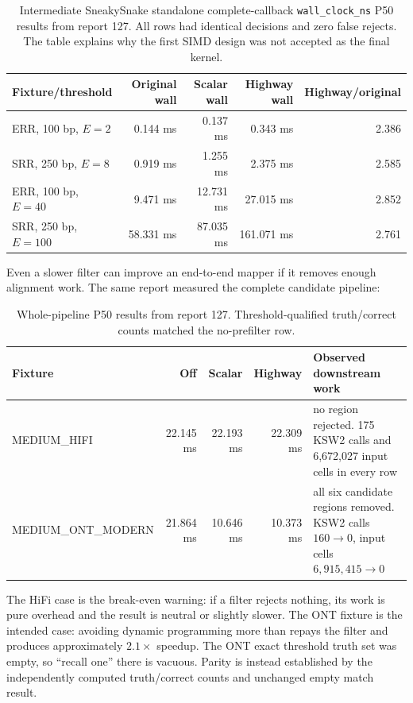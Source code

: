 \begin{table}[htbp]
\centering
\small
\begin{tabular}{lrrrr}
\textbf{Fixture/threshold} & \textbf{Original wall} & \textbf{Scalar wall} &
\textbf{Highway wall} & \textbf{Highway/original}\\
\hline
ERR, 100 bp, \(E=2\)   & 0.144 ms & 0.137 ms & 0.343 ms & 2.386\\
SRR, 250 bp, \(E=8\)   & 0.919 ms & 1.255 ms & 2.375 ms & 2.585\\
ERR, 100 bp, \(E=40\)  & 9.471 ms & 12.731 ms & 27.015 ms & 2.852\\
SRR, 250 bp, \(E=100\) & 58.331 ms & 87.035 ms & 161.071 ms & 2.761\\
\end{tabular}
\caption{Intermediate SneakySnake standalone complete-callback
\texttt{wall\_clock\_ns} P50 results from report 127.  All rows had identical
decisions and zero false rejects.  The table explains why the first SIMD
design was not accepted as the final kernel.}
\label{tab:sneaky-intermediate}
\end{table}

Even a slower filter can improve an end-to-end mapper if it removes enough
alignment work.  The same report measured the complete candidate pipeline:

\begin{table}[htbp]
\centering
\small
\setlength{\tabcolsep}{4pt}
\begin{tabular}{lrrrp{}}
\textbf{Fixture} & \textbf{Off} & \textbf{Scalar} & \textbf{Highway} &
\textbf{Observed downstream work}\\
\hline
MEDIUM\_HIFI & 22.145 ms & 22.193 ms & 22.309 ms &
no region rejected. 175 KSW2 calls and 6,672,027 input cells in every row\\
MEDIUM\_ONT\_MODERN & 21.864 ms & 10.646 ms & 10.373 ms &
all six candidate regions removed. KSW2 calls \(160\to0\), input cells
\(6{,}915{,}415\to0\)\\
\end{tabular}
\caption{Whole-pipeline P50 results from report 127.  Threshold-qualified
truth/correct counts matched the no-prefilter row.}
\label{tab:sneaky-pipeline}
\end{table}

The HiFi case is the break-even warning: if a filter rejects nothing, its work
is pure overhead and the result is neutral or slightly slower.  The ONT
fixture is the intended case: avoiding dynamic programming more than repays
the filter and produces approximately \(2.1\times\) speedup.  The ONT exact
threshold truth set was empty, so ``recall one'' there is vacuous.  Parity is
instead established by the independently computed truth/correct counts and
unchanged empty match result.

